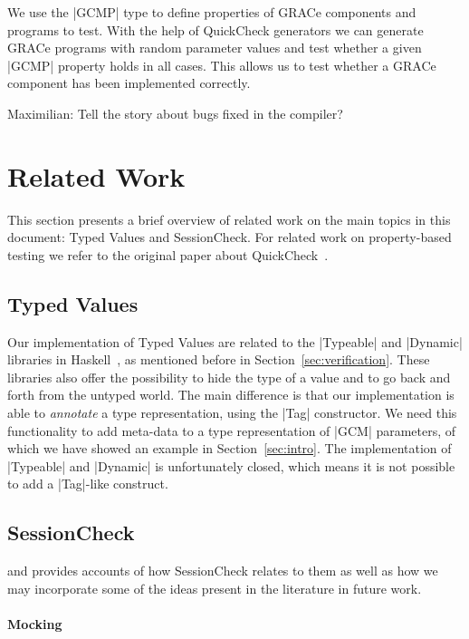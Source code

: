 \documentclass{article}
\begin{document}
We use the |GCMP| type to define properties of GRACe components and programs to
test.
%
With the help of QuickCheck generators we can generate GRACe programs with
random parameter values and test whether a given |GCMP| property holds in all
cases.
%
This allows us to test whether a GRACe component has been implemented correctly.


Maximilian: Tell the story about bugs fixed in the compiler?


\section{Related Work}

This section presents a brief overview of related work on the main topics in this
document: Typed Values and SessionCheck. For related work on property-based 
testing we refer to the original paper about QuickCheck~\cite{QuickCheck}. 

\subsection{Typed Values}

Our implementation of Typed Values are related to the |Typeable| and |Dynamic|
libraries in Haskell~\cite{DataDynamic}, as mentioned before in
Section~\ref{sec:verification}. These libraries also offer the possibility to
hide the type of a value and to go back and forth from the untyped world. The
main difference is that our implementation is able to \emph{annotate} a type
representation, using the |Tag| constructor. We need this functionality to add
meta-data to a type representation of |GCM| parameters, of which we have showed an 
example in Section~\ref{sec:intro}. The implementation of |Typeable| and 
|Dynamic| is unfortunately closed, which means it is not possible to add a 
|Tag|-like construct.


\subsection{SessionCheck}
and provides accounts
of how SessionCheck relates to them as well as how we may incorporate some of
the ideas present in the literature in future work.

\paragraph{Mocking}
\end{document}
